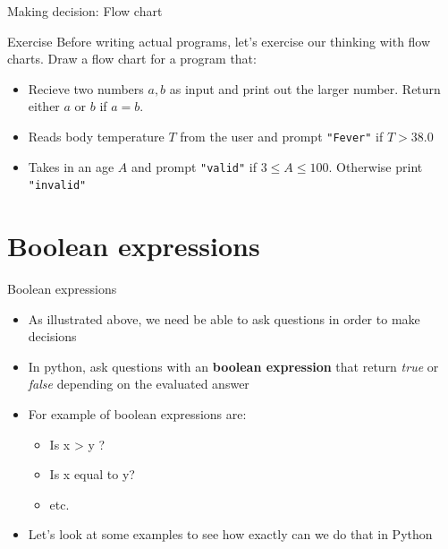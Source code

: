 \documentclass[10pt,xcolor={table,dvipsnames},t]{beamer}
\begin{document}
\begin{frame}{Making decision: Flow chart}
  \begin{figure}
  \end{figure}
\end{frame}

\begin{frame}{Exercise}
  Before writing actual programs, let's exercise our thinking with flow charts. Draw a flow chart for a program that:
  \begin{itemize}
    \item Recieve two numbers $a,b$ as input and print out the larger number. Return either $a$ or $b$ if $a=b$.
    \item Reads body temperature $T$ from the user and prompt \texttt{"Fever"} if $T>38.0$
    \item Takes in an age $A$ and prompt \texttt{"valid"} if $3 \leq A \leq 100$. Otherwise print \texttt{"invalid"}
   \end{itemize}  
\end{frame}

\section{Boolean expressions}
\begin{frame}{Boolean expressions}
  \begin{itemize}
    \item As illustrated above, we need be able to ask questions in order to make decisions
    \item In python, ask questions with an \textbf{boolean expression} that return \textit{true} or \textit{false} depending on the evaluated answer
    \item For example of boolean expressions are:
    \begin{itemize}
      \item Is x > y ?
      \item Is x equal to y?
      \item etc.
    \end{itemize}
    \item Let's look at some examples to see how exactly can we do that in Python
  \end{itemize}
\end{frame}
\end{document}
